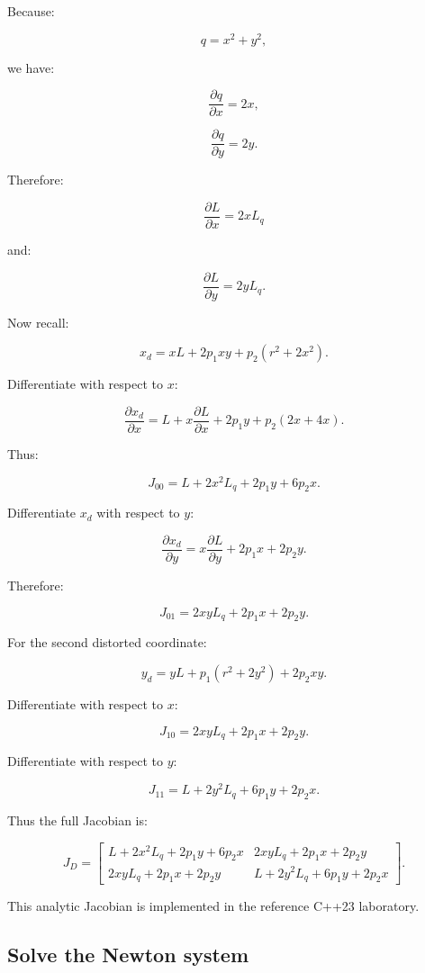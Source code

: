 Because:

\[
 q=x^2+y^2,
\]

we have:

\[
 \frac{\partial q}{\partial x}=2x,
\]

\[
 \frac{\partial q}{\partial y}=2y.
\]

Therefore:

\[
 \boxed{ \frac{\partial L}{\partial x}=2xL_q }
\]

and:

\[
 \boxed{ \frac{\partial L}{\partial y}=2yL_q }.
\]

Now recall:

\[
 x_d=xL+2p_1xy+p_2(r^2+2x^2).
\]

Differentiate with respect to \(x\):

\[
 \frac{\partial x_d}{\partial x} = L+x\frac{\partial L}{\partial x} +2p_1y +p_2(2x+4x).
\]

Thus:

\[
 \boxed{ J_{00}= L+2x^2L_q+2p_1y+6p_2x }.
\]

Differentiate \(x_d\) with respect to \(y\):

\[
 \frac{\partial x_d}{\partial y} = x\frac{\partial L}{\partial y} +2p_1x +2p_2y.
\]

Therefore:

\[
 \boxed{ J_{01}= 2xyL_q+2p_1x+2p_2y }.
\]

For the second distorted coordinate:

\[
 y_d=yL+p_1(r^2+2y^2)+2p_2xy.
\]

Differentiate with respect to \(x\):

\[
 \boxed{ J_{10}= 2xyL_q+2p_1x+2p_2y }.
\]

Differentiate with respect to \(y\):

\[
 \boxed{ J_{11}= L+2y^2L_q+6p_1y+2p_2x }.
\]

Thus the full Jacobian is:

\[
 \boxed{ J_D= \begin{bmatrix} L+2x^2L_q+2p_1y+6p_2x& 2xyL_q+2p_1x+2p_2y\\ 2xyL_q+2p_1x+2p_2y& L+2y^2L_q+6p_1y+2p_2x \end{bmatrix} }.
\]

This analytic Jacobian is implemented in the reference C++23 laboratory.

\subsection{Solve the Newton system}\label{02-foundations-ii-ch035-solve-the-newton-system}


